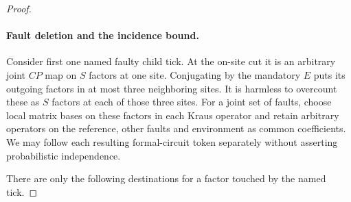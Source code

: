 \begin{proof}
\paragraph{Fault deletion and the incidence bound.}

Consider first one named faulty child tick. At the on-site cut it is an arbitrary joint \(CP\) map on \(S\) factors at one site. Conjugating by the mandatory \(E\) puts its outgoing factors in at most three neighboring sites. It is harmless to overcount these as \(S\) factors at each of those three sites. For a joint set of faults, choose local matrix bases on these factors in each Kraus operator and retain arbitrary operators on the reference, other faults and environment as common coefficients. We may follow each resulting formal-circuit token separately without asserting probabilistic independence.

There are only the following destinations for a factor touched by the named tick.


\end{proof}
